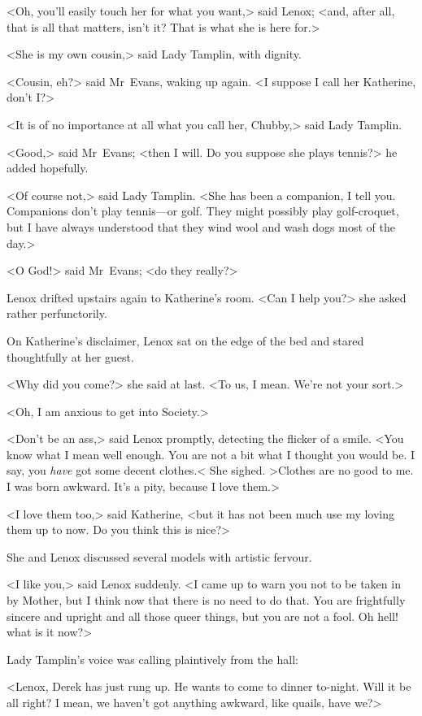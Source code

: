 <Oh, you'll easily touch her for what you want,> said Lenox; <and, after all, that is all that matters, isn't it? That is what she is here for.>

<She is my own cousin,> said Lady Tamplin, with dignity.

<Cousin, eh?> said Mr~Evans, waking up again. <I suppose I call her Katherine, don't I?>

<It is of no importance at all what you call her, Chubby,> said Lady Tamplin.

<Good,> said Mr~Evans; <then I will. Do you suppose she plays tennis?> he added hopefully.

<Of course not,> said Lady Tamplin. <She has been a companion, I tell you. Companions don't play tennis—or golf. They might possibly play golf-croquet, but I have always understood that they wind wool and wash dogs most of the day.>

<O God!> said Mr~Evans; <do they really?>

Lenox drifted upstairs again to Katherine's room. <Can I help you?> she asked rather perfunctorily.

On Katherine's disclaimer, Lenox sat on the edge of the bed and stared thoughtfully at her guest.

<Why did you come?> she said at last. <To us, I mean. We're not your sort.>

<Oh, I am anxious to get into Society.>

<Don't be an ass,> said Lenox promptly, detecting the flicker of a smile. <You know what I mean well enough. You are not a bit what I thought you would be. I say, you \emph{have} got some decent clothes.< She sighed. >Clothes are no good to me. I was born awkward. It's a pity, because I love them.>

<I love them too,> said Katherine, <but it has not been much use my loving them up to now. Do you think this is nice?>

She and Lenox discussed several models with artistic fervour.

<I like you,> said Lenox suddenly. <I came up to warn you not to be taken in by Mother, but I think now that there is no need to do that. You are frightfully sincere and upright and all those queer things, but you are not a fool. Oh hell! what is it now?>

Lady Tamplin's voice was calling plaintively from the hall:

<Lenox, Derek has just rung up. He wants to come to dinner to-night. Will it be all right? I mean, we haven't got anything awkward, like quails, have we?>


